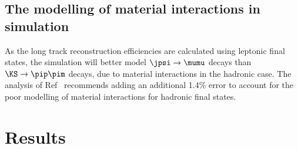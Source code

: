 \subsection{The modelling of material interactions in simulation}
\label{sec:mismod}
As the long track reconstruction efficiencies are calculated using leptonic final states, the simulation will better model $\jpsi\to\mumu$ decays than $\KS\to\pip\pim$ decays, due to material interactions in the hadronic case. The analysis of Ref~\cite{LHCB-DP-2013-002} recommends adding an additional 1.4\% error to account for the poor modelling of material interactions for hadronic final states. %

 




\section{Results}
\label{sec:results}



